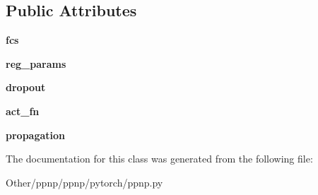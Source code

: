 \subsection*{Public Attributes}
\begin{DoxyCompactItemize}
\item 
\mbox{\label{classppnp_1_1pytorch_1_1ppnp_1_1PPNP_a4402ebfec9778d94f0e4ced8ad58d36b}} 
{\bfseries fcs}
\item 
\mbox{\label{classppnp_1_1pytorch_1_1ppnp_1_1PPNP_a3d8e47b9edba661bb8a6bc495c9a29a1}} 
{\bfseries reg\+\_\+params}
\item 
\mbox{\label{classppnp_1_1pytorch_1_1ppnp_1_1PPNP_ab653a22b5088fe4736aa1dc34d19d7e7}} 
{\bfseries dropout}
\item 
\mbox{\label{classppnp_1_1pytorch_1_1ppnp_1_1PPNP_a25d2008815ee74feea7b2cf44a1ac3ba}} 
{\bfseries act\+\_\+fn}
\item 
\mbox{\label{classppnp_1_1pytorch_1_1ppnp_1_1PPNP_a397b5cbe8e308a802c09714f3246f733}} 
{\bfseries propagation}
\end{DoxyCompactItemize}


The documentation for this class was generated from the following file\+:\begin{DoxyCompactItemize}
\item 
Other/ppnp/ppnp/pytorch/ppnp.\+py\end{DoxyCompactItemize}

